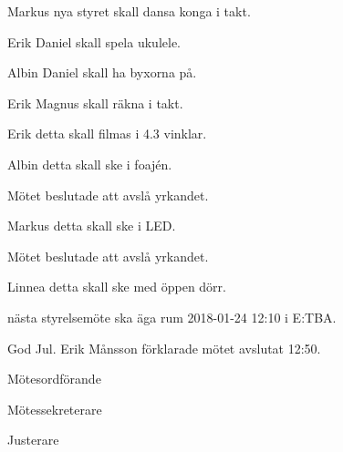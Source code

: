 \documentclass[10pt]{article}
\def\mo{Erik Månsson}
\def\ms{Johan Karlberg}
\def\ji{Edvard Carlsson}
\begin{document}
\begin{paragrafer}
Markus \ypa nya styret skall dansa konga i takt.

\Mbaby

Erik \ypa Daniel skall spela ukulele.

\Mbaby

Albin \ypa Daniel skall ha byxorna på.

\Mbaby

Erik \ypa Magnus skall räkna i takt.

\Mbaby

Erik \ypa detta skall filmas i 4.3 vinklar.

\Mbaby

Albin \ypa detta skall ske i foajén.

Mötet beslutade att avslå yrkandet.

Markus \ypa detta skall ske i LED.

Mötet beslutade att avslå yrkandet.

Linnea \ypa detta skall ske med öppen dörr.

\Mbaby

{\Mba} nästa styrelsemöte ska äga rum 2018-01-24 12:10 i E:TBA.


God Jul.
{\mo} förklarade mötet avslutat 12:50.

\end{paragrafer}

\hidesignfoot
\begin{signatures}{3}
\signature{\mo}{Mötesordförande}
\signature{\ms}{Mötessekreterare}
\signature{\ji}{Justerare}
\end{signatures}
\end{document}
